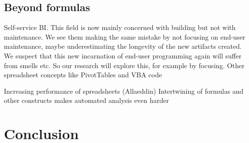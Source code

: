 \documentclass[conference]{IEEEtran}
\begin{document}
\subsection{Beyond formulas}

  Self-service BI. This field is now mainly concerned with building but not with maintenance. We see them making the same mistake by not focusing on end-user maintenance, maybe underestimating the longevity of the new artifacts created. We suspect that this new incarnation of end-user programming again will suffer from smells etc. So our research will explore this, for example by focusing. Other spreadsheet concepts like PivotTables and VBA code
  

Increasing performance of spreadsheets (Allaeddin)
Intertwining of formulas and other constructs makes automated analysis even harder



\section{Conclusion}













\end{document}
